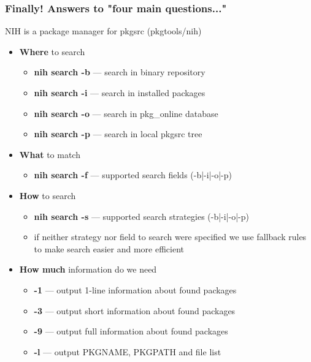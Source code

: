 \documentclass[hyperref=unicode,ascii,xcolor=dvipsnames]{beamer}
\begin{document}

\begin{frame}[fragile]
  \frametitle{Finally! Answers to "four main questions..."}
NIH is a package manager for pkgsrc (pkgtools/nih)
\begin{itemize}
\item {\bf Where} to search
  \begin{itemize}
  \item {\bf nih search -b} --- search in binary repository
  \item {\bf nih search -i} --- search in installed packages
  \item {\bf nih search -o} --- search in pkg\_online database
  \item {\bf nih search -p} --- search in local pkgsrc tree
  \end{itemize}
\item {\bf What} to match
  \begin{itemize}
  \item {\bf nih search -f} --- supported search fields (-b|-i|-o|-p)
  \end{itemize}
\item {\bf How} to search
  \begin{itemize}
  \item {\bf nih search -s} --- supported search strategies (-b|-i|-o|-p)
  \item if neither strategy nor field to search were specified we use
    fallback rules to make search easier and more efficient
  \end{itemize}
\item {\bf How much} information do we need
  \begin{itemize}
  \item {\bf -1} --- output 1-line information about found packages
  \item {\bf -3} --- output short information about found packages
  \item {\bf -9} --- output full information about found packages
  \item {\bf -l} --- output PKGNAME, PKGPATH and file list
  \end{itemize}
\end{itemize}
\end{frame}

\end{document}

